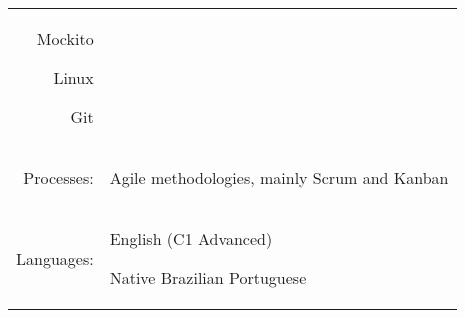 \documentclass[a4paper,12pt]{article}
\begin{document}
\begin{tabular}{rp{15.2cm}}
\begin{itemize*}[label=\Large\textbullet]
    \item Mockito
    \item Linux
    \item Git
\end{itemize*}\\
\raggedleft Processes:
& \begin{itemize*}[label=\Large\textbullet]
    \item Agile methodologies, mainly Scrum and Kanban
\end{itemize*}\\
\raggedleft Languages:
& \begin{itemize*}[label=\Large\textbullet]
    \item English (C1 Advanced)
    \item Native Brazilian Portuguese
\end{itemize*}\\
\end{tabular}
\end{document}
